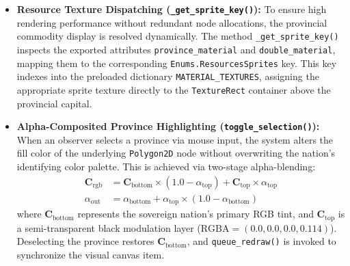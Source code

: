 \begin{itemize}
    \item \textbf{Resource Texture Dispatching (\texttt{\_get\_sprite\_key()}):} To ensure high rendering performance without redundant node allocations, the provincial commodity display is resolved dynamically. The method \texttt{\_get\_sprite\_key()} inspects the exported attributes \texttt{province\_material} and \texttt{double\_material}, mapping them to the corresponding \texttt{Enums.ResourcesSprites} key. This key indexes into the preloaded dictionary \texttt{MATERIAL\_TEXTURES}, assigning the appropriate sprite texture directly to the \texttt{TextureRect} container above the provincial capital.
    \item \textbf{Alpha-Composited Province Highlighting (\texttt{toggle\_selection()}):} When an observer selects a province via mouse input, the system alters the fill color of the underlying \texttt{Polygon2D} node without overwriting the nation's identifying color palette. This is achieved via two-stage alpha-blending:
    \begin{align}
        \mathbf{C}_{\text{rgb}} &= \mathbf{C}_{\text{bottom}} \times (1.0 - \alpha_{\text{top}}) + \mathbf{C}_{\text{top}} \times \alpha_{\text{top}} \\
        \alpha_{\text{out}} &= \alpha_{\text{bottom}} + \alpha_{\text{top}} \times (1.0 - \alpha_{\text{bottom}})
    \end{align}
    where $\mathbf{C}_{\text{bottom}}$ represents the sovereign nation's primary RGB tint, and $\mathbf{C}_{\text{top}}$ is a semi-transparent black modulation layer ($\text{RGBA} = (0.0, 0.0, 0.0, 0.114)$). Deselecting the province restores $\mathbf{C}_{\text{bottom}}$, and \texttt{queue\_redraw()} is invoked to synchronize the visual canvas item.
\end{itemize}

